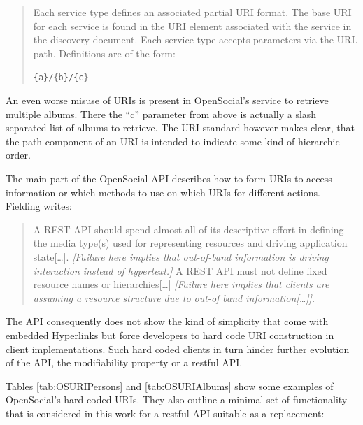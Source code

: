 \documentclass[12pt,a4paper,twoside]{scrartcl}		%
\newcommand{\citeurl}[2]{\url{#1} (#2)}
\begin{document}
\begin{quote}
  Each service type defines an associated partial URI format. The base URI for
  each service is found in the URI element associated with the service in the
  discovery document. Each service type accepts parameters via the URL
  path. Definitions are of the form:
  
  \lstinline:{a}/{b}/{c}:
\end{quote}

An even worse misuse of URIs is present in OpenSocial's service to retrieve
multiple albums. There the ``c'' parameter from above is actually a slash
separated list of albums to retrieve. The URI standard however makes clear, that
the path component of an URI is intended to indicate some kind of hierarchic
order\cite[sec 3.3]{RFC3986}.


The main part of the OpenSocial API describes how to form URIs to access
information or which methods to use on which URIs for different
actions. Fielding writes:

\begin{quote}
  A REST API should spend almost all of its descriptive effort in defining the
  media type(s) used for representing resources and driving application
  state[\ldots].  \textit{[Failure here implies that out-of-band information is
    driving interaction instead of hypertext.]}  A REST API must not define
  fixed resource names or hierarchies[\ldots] \textit{[Failure here implies that
    clients are assuming a resource structure due to out-of band
    information[\ldots]].}
\end{quote}

The API consequently does not show the kind of simplicity that come with
embedded Hyperlinks but force developers to hard code URI construction in client
implementations. Such hard coded clients in turn hinder further evolution of the
API, the modifiability property or a restful API\cite[sec 2.3]{Fielding2000}.

Tables \ref{tab:OSURIPersons} and \ref{tab:OSURIAlbums} show some examples of
OpenSocial's hard coded URIs. They also outline a minimal set of functionality
that is considered in this work for a restful API suitable as a replacement:
\end{document}
